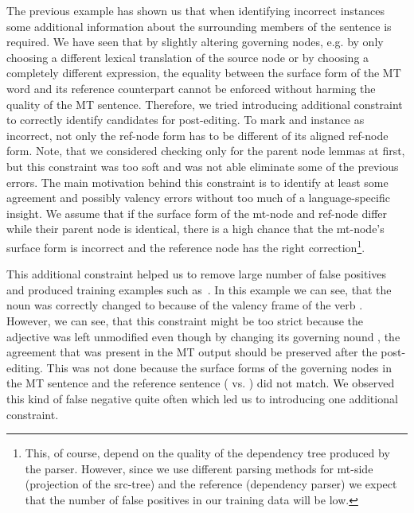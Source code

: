 The previous example has shown us that when identifying incorrect instances some additional information
about the surrounding members of the sentence is required.
We have seen that by slightly altering governing nodes, e.g.
by only choosing a different lexical translation of the source node or by choosing a completely different expression,
the equality between the surface form of the MT word and its reference counterpart cannot
be enforced without harming the quality of the MT sentence.
Therefore, we tried introducing additional constraint to correctly identify candidates for post-editing.
To mark and instance as incorrect, not only the ref-node form has to be different of its aligned
ref-node form. Note, that we considered checking only for the parent node lemmas at first, but this constraint
was too soft and was not able eliminate some of the previous errors.
The main motivation behind this constraint is to identify at least some agreement and possibly valency errors
without too much of a language-specific insight. We assume that if the surface form of the mt-node and ref-node
differ while their parent node is identical, there is a high chance that the mt-node's surface form is
incorrect and the reference node has the right correction\footnote{This, of course, depend on the quality of the dependency
tree produced by the parser. However, since we use different parsing methods for mt-side (projection of the src-tree) and
the reference (dependency parser) we expect that the number of false positives in our training data will be low.}.


This additional constraint helped us to remove large number of false positives and produced training examples
such as~. In this example we can see, that the noun  was correctly changed
to  because of the valency frame of the verb . However, we can see, that this constraint
might be too strict because the adjective  was left unmodified even though by changing its
governing nound , the agreement that was present in the MT output should be preserved after the
post-editing. This was not done because the surface forms of the governing nodes in the MT sentence and the reference sentence
( vs. ) did not match. We observed this kind of false negative quite often which
led us to introducing one additional constraint.



